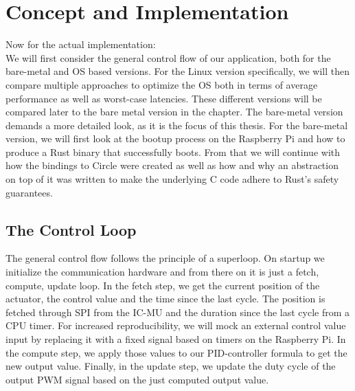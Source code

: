 
\chapter{Concept and Implementation}
\label{chap:concept_and_implementation}

Now for the actual implementation:\\
We will first consider the general control flow of our application, both for the bare-metal and OS based versions.
For the Linux version specifically, we will then compare multiple approaches to optimize the OS both in terms of average performance as well as worst-case latencies.
These different versions will be compared later to the bare metal version in the  chapter.
The bare-metal version demands a more detailed look, as it is the focus of this thesis.
For the bare-metal version, we will first look at the bootup process on the Raspberry Pi and how to produce a Rust binary that successfully boots.
From that we will continue with how the bindings to Circle were created as well as how and why an abstraction on top of it was written to make the underlying C code adhere to Rust's safety guarantees.

\section{The Control Loop}
\label{sec:concept_and_implementation:control_flow}

The general control flow follows the principle of a superloop.
On startup we initialize the communication hardware and from there on it is just a fetch, compute, update loop.
In the fetch step, we get the current position of the actuator, the control value and the time since the last cycle.
The position is fetched through SPI from the IC-MU and the duration since the last cycle from a CPU timer.
For increased reproducibility, we will mock an external control value input by replacing it with a fixed signal based on timers on the Raspberry Pi.
In the compute step, we apply those values to our PID-controller formula to get the new output value.
Finally, in the update step, we update the duty cycle of the output PWM signal based on the just computed output value.

